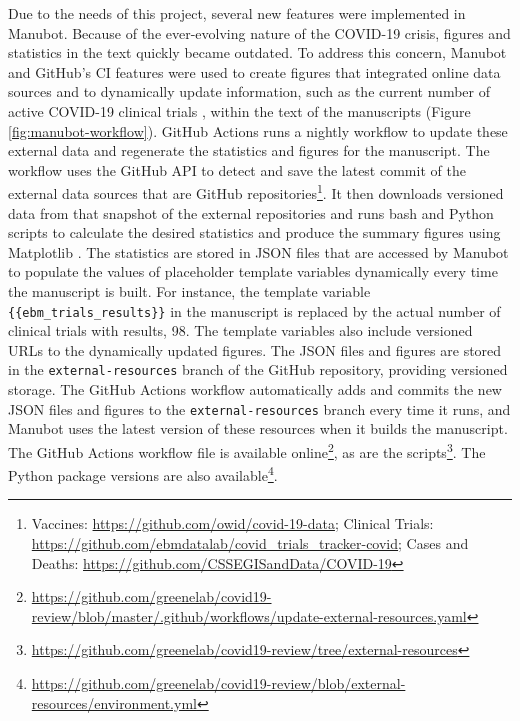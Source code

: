 \documentclass[twocolumn]{ceurart}
\begin{document}
Due to the needs of this project, several new features were implemented in Manubot.
Because of the ever-evolving nature of the COVID-19 crisis, figures and statistics in the text quickly became outdated.
To address this concern, Manubot and GitHub's CI features were used to create figures that integrated online data sources and to dynamically update information, such as the current number of active COVID-19 clinical trials \citep{njpLhBui}, within the text of the manuscripts (Figure \ref{fig:manubot-workflow}).
GitHub Actions runs a nightly workflow to update these external data and regenerate the statistics and figures for the manuscript.
The workflow uses the GitHub API to detect and save the latest commit of the external data sources that are GitHub repositories\footnote{Vaccines: \url{https://github.com/owid/covid-19-data}; Clinical Trials: \url{https://github.com/ebmdatalab/covid_trials_tracker-covid}; Cases and Deaths: \url{https://github.com/CSSEGISandData/COVID-19}}.
It then downloads versioned data from that snapshot of the external repositories and runs bash and Python scripts to calculate the desired statistics and produce the summary figures using Matplotlib \citep{1026Gxdsi}.
The statistics are stored in JSON files that are accessed by Manubot to populate the values of placeholder template variables dynamically every time the manuscript is built.
For instance, the template variable \texttt{\{\{ebm\_trials\_results\}\}} in the manuscript is replaced by the actual number of clinical trials with results, 98.
The template variables also include versioned URLs to the dynamically updated figures.
The JSON files and figures are stored in the \texttt{external-resources} branch of the GitHub repository, providing versioned storage.
The GitHub Actions workflow automatically adds and commits the new JSON files and figures to the \texttt{external-resources} branch every time it runs, and Manubot uses the latest version of these resources when it builds the manuscript.
The GitHub Actions workflow file is available online\footnote{\url{https://github.com/greenelab/covid19-review/blob/master/.github/workflows/update-external-resources.yaml}}, as are the scripts\footnote{\url{https://github.com/greenelab/covid19-review/tree/external-resources}}.
The Python package versions are also available\footnote{\url{https://github.com/greenelab/covid19-review/blob/external-resources/environment.yml}}.
\end{document}
